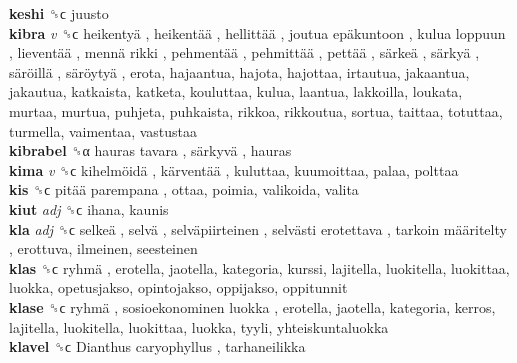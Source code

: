 \textbf{keshi} ␝ϲ  juusto  \\
\textbf{kibra} \emph{v}  ␝ϲ   heikentyä ,  heikentää ,  hellittää ,  joutua epäkuntoon ,  kulua loppuun ,  lieventää ,  mennä rikki ,  pehmentää ,  pehmittää ,  pettää ,  särkeä ,  särkyä ,  säröillä ,  säröytyä , erota, hajaantua, hajota, hajottaa, irtautua, jakaantua, jakautua, katkaista, katketa, kouluttaa, kulua, laantua, lakkoilla, loukata, murtaa, murtua, puhjeta, puhkaista, rikkoa, rikkoutua, sortua, taittaa, totuttaa, turmella, vaimentaa, vastustaa  \\
\textbf{kibrabel} ␝α   hauras tavara ,  särkyvä , hauras  \\
\textbf{kima} \emph{v}  ␝ϲ   kihelmöidä ,  kärventää , kuluttaa, kuumoittaa, palaa, polttaa  \\
\textbf{kis} ␝ϲ   pitää parempana , ottaa, poimia, valikoida, valita  \\
\textbf{kiut} \emph{adj}  ␝ϲ  ihana, kaunis  \\
\textbf{kla} \emph{adj}  ␝ϲ   selkeä ,  selvä ,  selväpiirteinen ,  selvästi erotettava ,  tarkoin määritelty , erottuva, ilmeinen, seesteinen  \\
\textbf{klas} ␝ϲ   ryhmä , erotella, jaotella, kategoria, kurssi, lajitella, luokitella, luokittaa, luokka, opetusjakso, opintojakso, oppijakso, oppitunnit  \\
\textbf{klase} ␝ϲ   ryhmä ,  sosioekonominen luokka , erotella, jaotella, kategoria, kerros, lajitella, luokitella, luokittaa, luokka, tyyli, yhteiskuntaluokka  \\
\textbf{klavel} ␝ϲ   Dianthus caryophyllus , tarhaneilikka  \\
